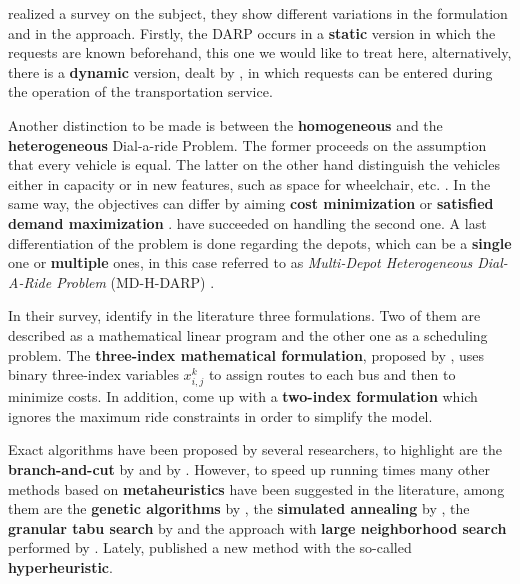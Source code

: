 \documentclass[tuberlin,cic,tc,openright,english,noabntcite,oneside]{iiufrgs}
\begin{document}
\textcite{cordeau_dial--ride_2007} realized a survey on the subject, they show different variations in the formulation and in the approach. Firstly, the DARP occurs in a \textbf{static} version in which the requests are known beforehand, this one we would like to treat here, alternatively, there is a \textbf{dynamic} version, dealt by \textcite{berbeglia_dynamic_2010}, in which requests can be entered during the operation of the transportation service.

Another distinction to be made is between the \textbf{homogeneous} and the \textbf{heterogeneous} Dial-a-ride Problem. The former proceeds on the assumption that every vehicle is equal. The latter on the other hand distinguish the vehicles either in capacity or in new features, such as space for wheelchair, etc. \parencite[p. 593]{parragh_models_2012}. In the same way, the objectives can differ by aiming \textbf{cost minimization} or \textbf{satisfied demand maximization} \parencite[p. 30]{cordeau_dial--ride_2007}. \textcite{urra_hyperheuristic_2015} have succeeded on handling the second one. A last differentiation of the problem is done regarding the depots, which can be a \textbf{single} one or \textbf{multiple} ones, in this case referred to as \emph{Multi-Depot Heterogeneous Dial-A-Ride Problem} (MD-H-DARP) \parencite[p. 166]{braekers_exact_2014}.

In their survey, \textcite{cordeau_dial--ride_2007} identify in the literature three formulations. Two of them are described as a mathematical linear program and the other one as a scheduling problem. The \textbf{three-index mathematical formulation}, proposed by \textcite{cordeau_branch-and-cut_2006}, uses binary three-index variables $x_{i,j}^{k}$ to assign routes to each bus and then to minimize costs. In addition, \textcite{ropke_models_2007} come up with a \textbf{two-index formulation} which ignores the maximum ride constraints in order to simplify the model.

Exact algorithms have been proposed by several researchers, to highlight are the \textbf{branch-and-cut} by \textcite{cordeau_branch-and-cut_2006} and by \textcite{ropke_models_2007}. However, to speed up running times many other methods based on \textbf{metaheuristics} have been suggested in the literature, among them are the \textbf{genetic algorithms} by \textcite{jorgensen_solving_2007}, the \textbf{simulated annealing} by \textcite{zidi_multi-objective_2012}, the \textbf{granular tabu search} by \textcite{kirchler_granular_2013} and the approach with \textbf{large neighborhood search} performed by \textcite{parragh_hybrid_2013}. Lately, \textcite{urra_hyperheuristic_2015} published a new method with the so-called \textbf{hyperheuristic}.
\end{document}
